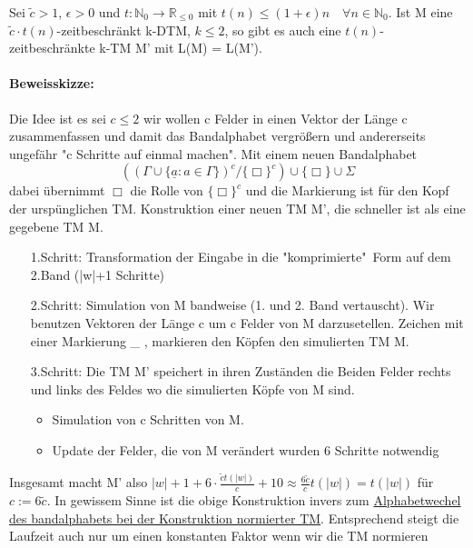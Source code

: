     Sei \(\tilde{c} > 1\), \(\epsilon > 0\) und \(t: \mathbb{N}_0 \to \mathbb{R}_{\leq 0}\) mit \(t(n) \leq (1+ \epsilon)n \quad \forall n \in \mathbb{N}_0\). Ist M eine \(\tilde{c}\cdot t(n)\)-zeitbeschränkt k-DTM, \(k \leq 2\), so gibt es auch eine \(t(n)\)-zeitbeschränkte k-TM M' mit L(M) = L(M').
    \paragraph*{Beweisskizze:}    
        Die Idee ist es sei \(c \leq 2\) wir wollen c Felder in einen Vektor der Länge c zusammenfassen und damit das Bandalphabet vergrößern und andererseits ungefähr "c Schritte auf einmal machen".
        Mit einem neuen Bandalphabet 
        \[
            ((\Gamma \cup \{\underline{a}: a \in \Gamma\})^c/\{\Box\}^c) \cup \{\Box\} \cup \Sigma
        \]
        dabei übernimmt \(\Box\) die Rolle von \(\{\Box\}^c\) und die Markierung ist für den Kopf der urspünglichen TM. 
        Konstruktion einer neuen TM M', die schneller ist als eine gegebene TM M.
        \begin{itemize}
            \item [1.Schritt:] Transformation der Eingabe in die "komprimierte"\ Form auf dem 2.Band (|w|+1 Schritte)
            \item [2.Schritt:] Simulation von M bandweise (1. und 2. Band vertauscht). Wir benutzen Vektoren der Länge c um c Felder von M darzusetellen. Zeichen mit einer Markierung \_ , markieren den Köpfen den simulierten TM M.
            \item [3.Schritt:] Die TM M' speichert in ihren Zuständen die Beiden Felder rechts und links des Feldes wo die simulierten Köpfe von M sind. 
            \begin{itemize}
                \item Simulation von c Schritten von M.
                \item Update der Felder, die von M verändert wurden 6 Schritte notwendig
            \end{itemize}
        \end{itemize}
        Insgesamt macht M' also \(|w|+ 1 + 6\cdot \frac{\tilde{c}t(|w|)}{c} + 10 \approx \frac{6\tilde{c}}{c} t(|w|) = t(|w|)\) für \(c := 6\tilde{c}\). In gewissem Sinne ist die obige Konstruktion invers zum \hyperref[subsec:2.18]{Alphabetwechel des bandalphabets bei der Konstruktion normierter TM}. Entsprechend steigt die Laufzeit auch nur um einen konstanten Faktor wenn wir die TM normieren 

